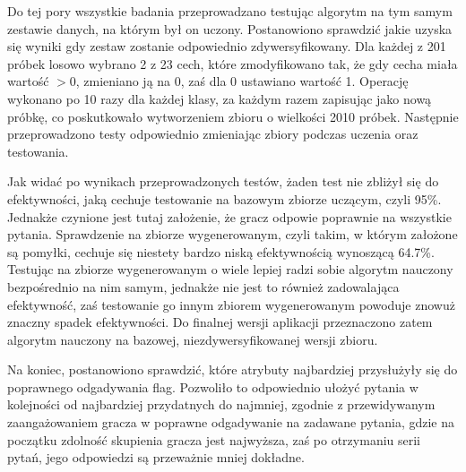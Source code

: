 Do tej pory wszystkie badania przeprowadzano testując algorytm na tym samym zestawie danych, na którym był on uczony. Postanowiono sprawdzić jakie uzyska się wyniki gdy zestaw zostanie odpowiednio zdywersyfikowany. Dla każdej z 201 próbek losowo wybrano 2 z 23 cech, które zmodyfikowano tak, że gdy cecha miała wartość $>0$, zmieniano ją na 0, zaś dla 0 ustawiano wartość 1. Operację wykonano po 10 razy dla każdej klasy, za każdym razem zapisując jako nową próbkę, co poskutkowało wytworzeniem zbioru o wielkości 2010 próbek. Następnie przeprowadzono testy odpowiednio zmieniając zbiory podczas uczenia oraz testowania.

\begin{table}[ht!]
\centering
\caption{Porównanie efektywności uczenia dla różnych zbiorów uczących i testowych}
\label{comparison}
\end{table}

Jak widać po wynikach przeprowadzonych testów, żaden test nie zbliżył się do efektywności, jaką cechuje testowanie na bazowym zbiorze uczącym, czyli 95\%. Jednakże czynione jest tutaj założenie, że gracz odpowie poprawnie na wszystkie pytania. Sprawdzenie na zbiorze wygenerowanym, czyli takim, w którym założone są pomyłki, cechuje się niestety bardzo niską efektywnością wynoszącą 64.7\%. Testując na zbiorze wygenerowanym o wiele lepiej radzi sobie algorytm nauczony bezpośrednio na nim samym, jednakże nie jest to również zadowalająca efektywność, zaś testowanie go innym zbiorem wygenerowanym powoduje znowuż znaczny spadek efektywności. Do finalnej wersji aplikacji przeznaczono zatem algorytm nauczony na bazowej, niezdywersyfikowanej wersji zbioru.

\newpage

Na koniec, postanowiono sprawdzić, które atrybuty najbardziej przysłużyły się do poprawnego odgadywania flag. Pozwoliło to odpowiednio ułożyć pytania w kolejności od najbardziej przydatnych do najmniej, zgodnie z przewidywanym zaangażowaniem gracza w poprawne odgadywanie na zadawane pytania, gdzie na początku zdolność skupienia gracza jest najwyższa, zaś po otrzymaniu serii pytań, jego odpowiedzi są przeważnie mniej dokładne.

